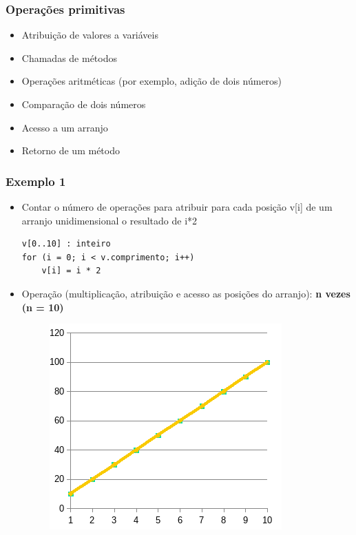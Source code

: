 \documentclass[aspectratio=169]{beamer}
\begin{document}
\begin{frame}\frametitle{Operações primitivas}
\begin{itemize}
	\item Atribuição de valores a variáveis
	\item Chamadas de métodos
	\item Operações aritméticas (por exemplo, adição de dois números)
	\item Comparação de dois números
	\item Acesso a um arranjo
	\item Retorno de um método
\end{itemize}
\end{frame}

\begin{frame}[fragile]\frametitle{Exemplo 1}
\begin{itemize}
	\item Contar o número de operações para atribuir para cada posição v[i] de um arranjo unidimensional o resultado de i*2
\begin{verbatim}
v[0..10] : inteiro
for (i = 0; i < v.comprimento; i++)
    v[i] = i * 2
\end{verbatim}
	\pause
	\item Operação (multiplicação, atribuição e acesso as posições do arranjo): \textbf{n vezes (n = 10)}
	\pause
	\begin{figure}[h]
		\centering
		\includegraphics[height=0.4\paperheight]{pucrs-ec-poo-unidade_01-complexidade_de_algoritmos-laminas-grafico2.png}
	\end{figure}
\end{itemize}
\end{frame}
\end{document}
